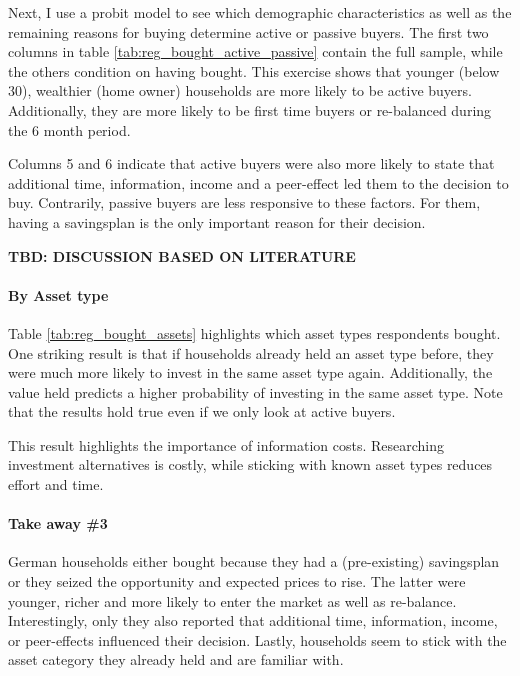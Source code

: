\documentclass[ProjectABM]{subfiles}
\begin{document}
Next, I use a probit model to see which demographic characteristics as well as the remaining reasons for buying determine active or passive buyers. The first two columns in table \ref{tab:reg_bought_active_passive} contain the full sample, while the others condition on having bought. This exercise shows that younger (below 30), wealthier (home owner) households are more likely to be active buyers. Additionally, they are more likely to be first time buyers or re-balanced during the 6 month period.

Columns 5 and 6 indicate that active buyers were also more likely to state that additional time, information, income and a peer-effect led them to the decision to buy. Contrarily, passive buyers are less responsive to these factors. For them, having a savingsplan is the only important reason for their decision.

\textbf{TBD: DISCUSSION BASED ON LITERATURE}




\paragraph{By Asset type}
Table \ref{tab:reg_bought_assets} highlights which asset types respondents bought. One striking result is that if households already held an asset type before, they were much more likely to invest in the same asset type again. Additionally, the value held predicts a higher probability of investing in the same asset type. Note that the results hold true even if we only look at active buyers.

This result highlights the importance of information costs. Researching investment alternatives is costly, while sticking with known asset types reduces effort and time.%



\paragraph{Take away \#3}
German households either bought because they had a (pre-existing) savingsplan or they seized the opportunity and expected prices to rise. The latter were younger, richer and more likely to enter the market as well as re-balance. Interestingly, only they also reported that additional time, information, income, or peer-effects influenced their decision. Lastly, households seem to stick with the asset category they already held and are familiar with.
\end{document}
